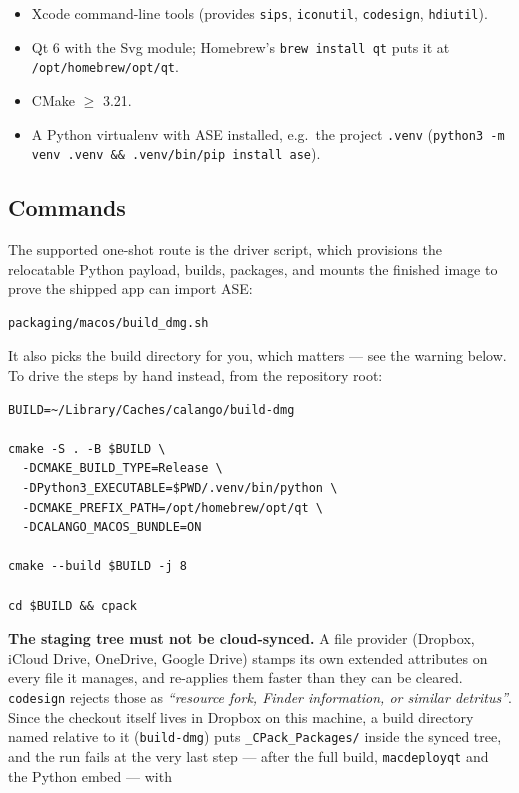 \documentclass[11pt,a4paper]{article}
\newcommand{\file}[1]{\texttt{#1}}
\newcommand{\opt}[1]{\texttt{#1}}
\begin{document}
\begin{itemize}[itemsep=2pt]
  \item Xcode command-line tools (provides \file{sips}, \file{iconutil},
        \file{codesign}, \file{hdiutil}).
  \item Qt 6 with the Svg module; Homebrew's \lstinline|brew install qt|
        puts it at \file{/opt/homebrew/opt/qt}.
  \item CMake $\geq$ 3.21.
  \item A Python virtualenv with ASE installed, e.g.\ the project
        \file{.venv} (\lstinline|python3 -m venv .venv && .venv/bin/pip install ase|).
\end{itemize}

\subsection{Commands}

The supported one-shot route is the driver script, which provisions the
relocatable Python payload, builds, packages, and mounts the finished
image to prove the shipped app can import ASE:

\begin{lstlisting}
packaging/macos/build_dmg.sh
\end{lstlisting}

\noindent It also picks the build directory for you, which matters --- see
the warning below. To drive the steps by hand instead, from the
repository root:

\begin{lstlisting}
BUILD=~/Library/Caches/calango/build-dmg

cmake -S . -B $BUILD \
  -DCMAKE_BUILD_TYPE=Release \
  -DPython3_EXECUTABLE=$PWD/.venv/bin/python \
  -DCMAKE_PREFIX_PATH=/opt/homebrew/opt/qt \
  -DCALANGO_MACOS_BUNDLE=ON

cmake --build $BUILD -j 8

cd $BUILD && cpack
\end{lstlisting}

\noindent\textbf{The staging tree must not be cloud-synced.} A file
provider (Dropbox, iCloud Drive, OneDrive, Google Drive) stamps its own
extended attributes on every file it manages, and re-applies them faster
than they can be cleared. \opt{codesign} rejects those as \emph{``resource fork,
Finder information, or similar detritus''}. Since the checkout itself
lives in Dropbox on this machine, a build directory named relative to it
(\file{build-dmg}) puts \file{\_CPack\_Packages/} inside the synced tree,
and the run fails at the very last step --- after the full build,
\file{macdeployqt} and the Python embed --- with
\end{document}
